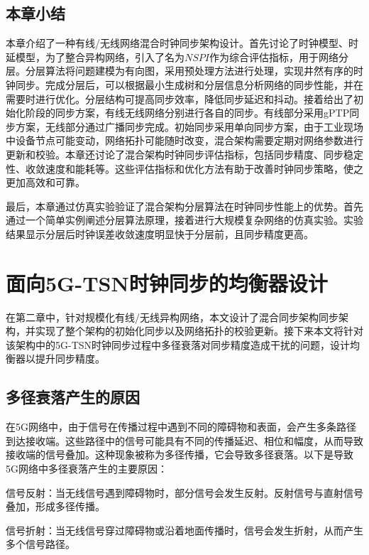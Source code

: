 \documentclass[UTF8,a4paper,12pt]{ctexart}
\numberwithin{equation}{section}
\begin{document}
\subsection{本章小结}
本章介绍了一种有线/无线网络混合时钟同步架构设计。首先讨论了时钟模型、时延模型，为了整合异构网络，引入了名为$NSPI$作为综合评估指标，用于网络分层。分层算法将问题建模为有向图，采用预处理方法进行处理，实现井然有序的时钟同步。完成分层后，可以根据最小生成树和分层信息分析网络的同步性能，并在需要时进行优化。分层结构可提高同步效率，降低同步延迟和抖动。接着给出了初始化阶段的同步方案，有线无线网络分别进行各自的同步。有线部分采用gPTP同步方案，无线部分通过广播同步完成。初始同步采用单向同步方案，由于工业现场中设备节点可能变动，网络拓扑可能随时改变，混合架构需要定期对网络参数进行更新和校验。本章还讨论了混合架构时钟同步评估指标，包括同步精度、同步稳定性、收敛速度和能耗等。这些评估指标和优化方法有助于改善时钟同步策略，使之更加高效和可靠。

最后，本章通过仿真实验验证了混合架构分层算法在时钟同步性能上的优势。首先通过一个简单实例阐述分层算法原理，接着进行大规模复杂网络的仿真实验。实验结果显示分层后时钟误差收敛速度明显快于分层前，且同步精度更高。

\newpage
{}
\section{面向5G-TSN时钟同步的均衡器设计}

在第二章中，针对规模化有线/无线异构网络，本文设计了混合同步架构同步架构，并实现了整个架构的初始化同步以及网络拓扑的校验更新。接下来本文将针对该架构中的5G-TSN时钟同步过程中多径衰落对同步精度造成干扰的问题，设计均衡器以提升同步精度。

\subsection{多径衰落产生的原因}

在5G网络中，由于信号在传播过程中遇到不同的障碍物和表面，会产生多条路径到达接收端。这些路径中的信号可能具有不同的传播延迟、相位和幅度，从而导致接收端的信号叠加。这种现象被称为多径传播，它会导致多径衰落。以下是导致5G网络中多径衰落产生的主要原因：

信号反射：当无线信号遇到障碍物时，部分信号会发生反射。反射信号与直射信号叠加，形成多径传播。

信号折射：当无线信号穿过障碍物或沿着地面传播时，信号会发生折射，从而产生多个信号路径。
\end{document}

